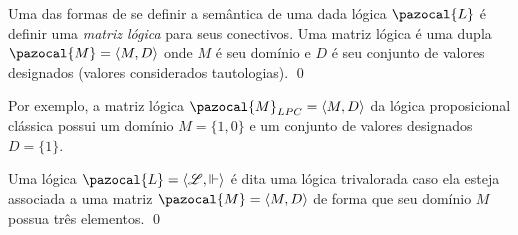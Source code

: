 \begin{definicao}
    Uma das formas de se definir a semântica de uma dada lógica $\pazocal{L}$ é definir uma \textit{matriz lógica} para seus conectivos. Uma matriz lógica é uma dupla $\pazocal{M} = \langle M, D \rangle$ onde $M$ é seu domínio e $D$ é seu conjunto de valores designados (valores considerados tautologias). \qed{}
\end{definicao}
Por exemplo, a matriz lógica $\pazocal{M}_{LPC} = \langle M, D \rangle$ da lógica proposicional clássica possui um domínio $M = \{1, 0\}$ e um conjunto de valores designados $D = \{1\}$.
\begin{definicao}
    Uma  lógica $\pazocal{L} = \langle \mathcal{L}, \Vdash \rangle$ é dita uma lógica trivalorada caso ela esteja associada a uma matriz $\pazocal{M} = \langle M, D \rangle$ de forma que seu domínio $M$ possua três elementos.
    \qed{}
\end{definicao}

